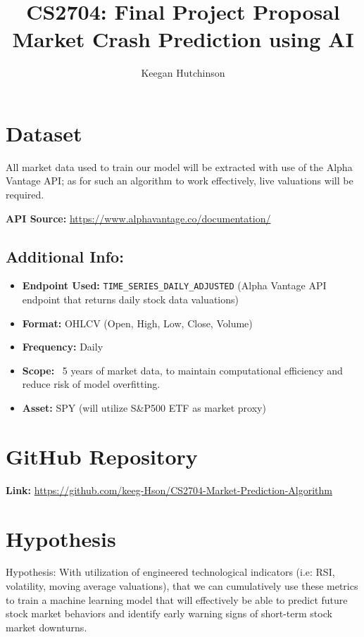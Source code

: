\documentclass[runningheads]{llncs}
\title{CS2704: Final Project Proposal \\ Market Crash Prediction using AI}
\author{Keegan Hutchinson}
\institute{University of New Brunswick Saint John}
\begin{document}
\maketitle

\section*{Dataset}

All market data used to train our model will be extracted with use of the Alpha Vantage API; as for such an algorithm to work effectively, live valuations will be required. 

\vspace{1.0em}

\textbf{API Source:} \url{https://www.alphavantage.co/documentation/}


\subsection*{Additional Info:}
\begin{itemize}
  \item \textbf {Endpoint Used:} \texttt{TIME\_SERIES\_DAILY\_ADJUSTED} (Alpha Vantage API endpoint that returns daily stock data valuations)
  \item \textbf {Format:} OHLCV (Open, High, Low, Close, Volume)
  \item  \textbf {Frequency:} Daily
  \item  \textbf {Scope:} ~5 years of market data, to maintain computational efficiency and reduce risk of model overfitting.
  \item  \textbf {Asset:} SPY (will utilize S\&P500 ETF as market proxy)
\end{itemize}

\section*{GitHub Repository}
\textbf{Link:} \url{https://github.com/keeg-Hson/CS2704-Market-Prediction-Algorithm}

\section*{Hypothesis}
Hypothesis: With utilization of engineered technological indicators (i.e: RSI, volatility, moving average valuations), that we can cumulatively use these metrics to train a machine learning model that will effectively be able to predict future stock market behaviors and identify early warning signs of short-term stock market downturns.
\end{document}
